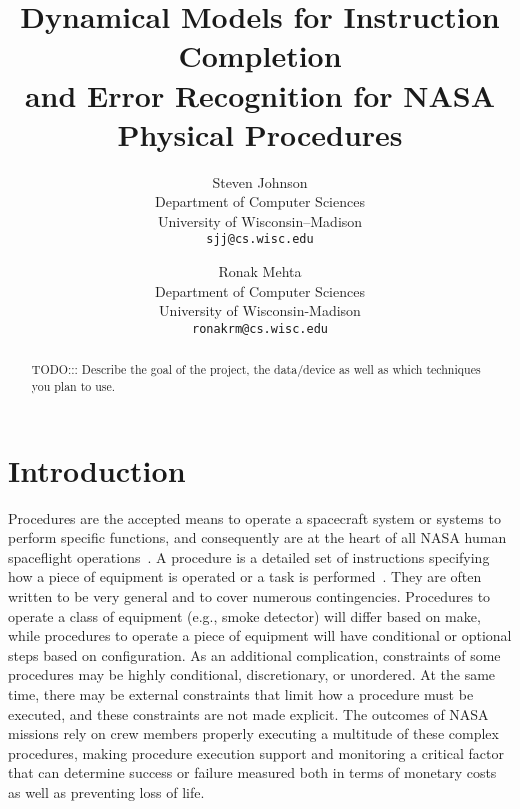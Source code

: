 \documentclass[10pt,letterpaper]{article}
\begin{document}
\title{Dynamical Models for Instruction Completion \\and Error Recognition for NASA Physical Procedures}

\author{Steven Johnson\\
Department of Computer Sciences\\
University of Wisconsin--Madison\\
{\tt\small sjj@cs.wisc.edu}
\and
Ronak Mehta\\
Department of Computer Sciences\\
University of Wisconsin-Madison\\
{\tt\small ronakrm@cs.wisc.edu}
}

\maketitle

\begin{abstract}
TODO::: Describe the goal of the project, the data/device as well as which techniques you plan to use.

\end{abstract}

\section{Introduction}

Procedures are the accepted means to operate a spacecraft system or systems to perform specific functions, and consequently are at the heart of all NASA human spaceflight operations~\cite{kortenkamp2008procedure}. A procedure is a detailed set of instructions specifying how a piece of equipment is operated or a task is performed~\cite{frank2010plans}. They are often written to be very general and to cover numerous contingencies. Procedures to operate a class of equipment (e.g., smoke detector) will differ based on make, while procedures to operate a piece of equipment will have conditional or optional steps based on configuration. As an additional complication, constraints of some procedures may be highly conditional, discretionary, or unordered. At the same time, there may be external constraints that limit how a procedure must be executed, and these constraints are not made explicit. The outcomes of NASA missions rely on crew members properly executing a multitude of these complex procedures, making procedure execution support and monitoring a critical factor that can determine success or failure measured both in terms of monetary costs as well as preventing loss of life.
\end{document}
